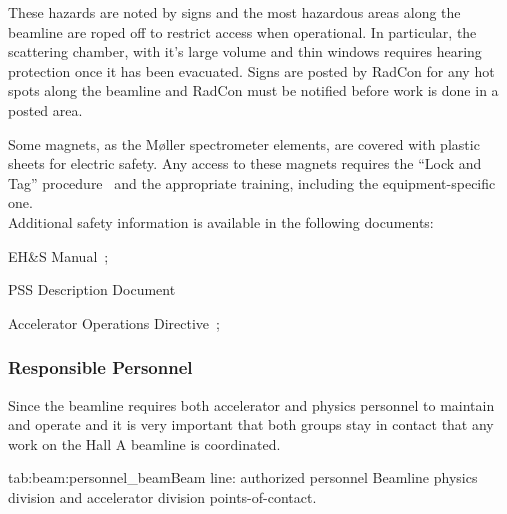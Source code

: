 \begin{safetyen}{0}{0}
These hazards are noted by signs and the most hazardous 
areas along the beamline
are roped off to restrict access when operational.   
In particular, the scattering chamber, with it's large
volume and thin windows requires hearing protection once it has been evacuated.   
Signs are posted by RadCon for any hot spots along the beamline and
RadCon must be notified before work is done in a posted area.

Some magnets, as the M{\o}ller spectrometer elements, are covered with plastic
sheets for electric safety. Any access to these magnets requires
the ``Lock and Tag'' procedure~\cite{EHScebaf} and the appropriate training,
including the equipment-specific one. \\

\noindent{}Additional safety information is available in the following documents:
\begin{list}{--}{\setlength{\itemsep}{-0.15cm}}
  \item EH\&S Manual~\cite{EHScebaf};
  \item PSS Description Document~\cite{PSScebaf}
  \item Accelerator Operations Directive~\cite{AODcebaf};
\end{list}

\subsubsection{Responsible Personnel}

Since the beamline requires both accelerator and physics personnel to maintain
and operate and it is very important that both groups stay in contact that any 
work on the Hall A beamline is coordinated.

\begin{namestab}{tab:beam:personnel_beam}{Beam line: authorized personnel}{%
   Beamline physics division and accelerator division points-of-contact.}
\end{namestab}
\end{safetyen}

